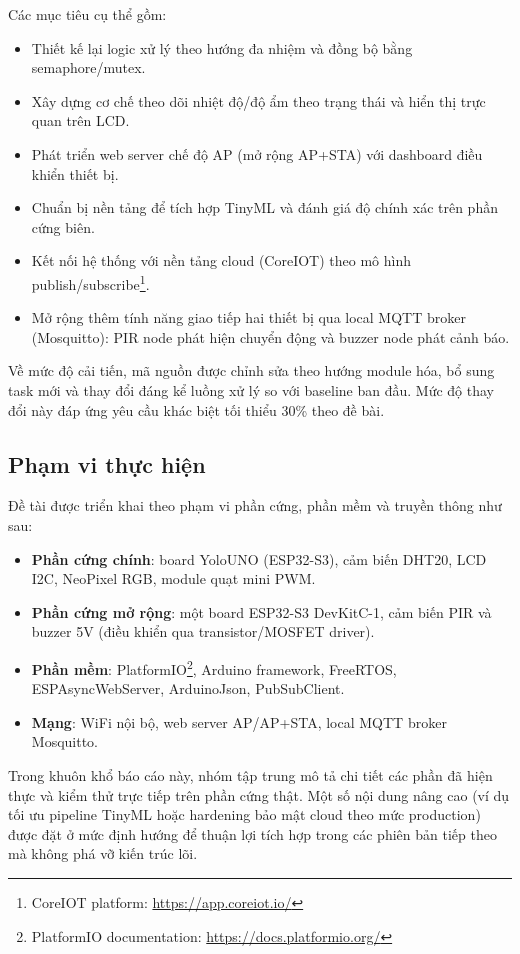 Các mục tiêu cụ thể gồm:
\begin{itemize}
    \item Thiết kế lại logic xử lý theo hướng đa nhiệm và đồng bộ bằng semaphore/mutex.
    \item Xây dựng cơ chế theo dõi nhiệt độ/độ ẩm theo trạng thái và hiển thị trực quan trên LCD.
    \item Phát triển web server chế độ AP (mở rộng AP+STA) với dashboard điều khiển thiết bị.
    \item Chuẩn bị nền tảng để tích hợp TinyML và đánh giá độ chính xác trên phần cứng biên.
    \item Kết nối hệ thống với nền tảng cloud (CoreIOT) theo mô hình publish/subscribe\footnote{CoreIOT platform: \url{https://app.coreiot.io/}}.
    \item Mở rộng thêm tính năng giao tiếp hai thiết bị qua local MQTT broker (Mosquitto): PIR node phát hiện chuyển động và buzzer node phát cảnh báo.
\end{itemize}

Về mức độ cải tiến, mã nguồn được chỉnh sửa theo hướng module hóa, bổ sung task mới và thay đổi đáng kể luồng xử lý so với baseline ban đầu. Mức độ thay đổi này đáp ứng yêu cầu khác biệt tối thiểu 30\% theo đề bài.

\subsection{Phạm vi thực hiện}

Đề tài được triển khai theo phạm vi phần cứng, phần mềm và truyền thông như sau:
\begin{itemize}
    \item \textbf{Phần cứng chính}: board YoloUNO (ESP32-S3), cảm biến DHT20, LCD I2C, NeoPixel RGB, module quạt mini PWM.
    \item \textbf{Phần cứng mở rộng}: một board ESP32-S3 DevKitC-1, cảm biến PIR và buzzer 5V (điều khiển qua transistor/MOSFET driver).
    \item \textbf{Phần mềm}: PlatformIO\footnote{PlatformIO documentation: \url{https://docs.platformio.org/}}, Arduino framework, FreeRTOS, ESPAsyncWebServer, ArduinoJson, PubSubClient.
    \item \textbf{Mạng}: WiFi nội bộ, web server AP/AP+STA, local MQTT broker Mosquitto.
\end{itemize}

Trong khuôn khổ báo cáo này, nhóm tập trung mô tả chi tiết các phần đã hiện thực và kiểm thử trực tiếp trên phần cứng thật. Một số nội dung nâng cao (ví dụ tối ưu pipeline TinyML hoặc hardening bảo mật cloud theo mức production) được đặt ở mức định hướng để thuận lợi tích hợp trong các phiên bản tiếp theo mà không phá vỡ kiến trúc lõi.


